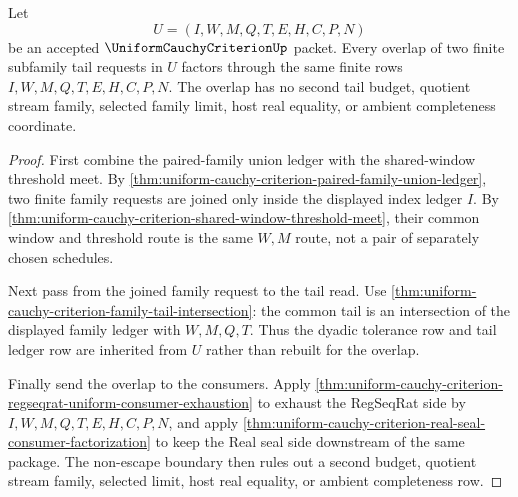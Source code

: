 \begin{theorem}
\label{thm:uniform-cauchy-criterion-tail-overlap-budget-exhaustion}
Let
$$
U=(I,W,M,Q,T,E,H,C,P,N)
$$
be an accepted $\UniformCauchyCriterionUp$ packet. Every overlap of two finite subfamily tail requests in $U$ factors through the same finite rows $I,W,M,Q,T,E,H,C,P,N$. The overlap has no second tail budget, quotient stream family, selected family limit, host real equality, or ambient completeness coordinate.
\end{theorem}
\begin{proof}
First combine the paired-family union ledger with the shared-window threshold meet. By \autoref{thm:uniform-cauchy-criterion-paired-family-union-ledger}, two finite family requests are joined only inside the displayed index ledger $I$. By \autoref{thm:uniform-cauchy-criterion-shared-window-threshold-meet}, their common window and threshold route is the same $W,M$ route, not a pair of separately chosen schedules.

Next pass from the joined family request to the tail read. Use \autoref{thm:uniform-cauchy-criterion-family-tail-intersection}: the common tail is an intersection of the displayed family ledger with $W,M,Q,T$. Thus the dyadic tolerance row and tail ledger row are inherited from $U$ rather than rebuilt for the overlap.

Finally send the overlap to the consumers. Apply \autoref{thm:uniform-cauchy-criterion-regseqrat-uniform-consumer-exhaustion} to exhaust the RegSeqRat side by $I,W,M,Q,T,E,H,C,P,N$, and apply \autoref{thm:uniform-cauchy-criterion-real-seal-consumer-factorization} to keep the Real seal side downstream of the same package. The non-escape boundary then rules out a second budget, quotient stream family, selected limit, host real equality, or ambient completeness row.
\end{proof}


